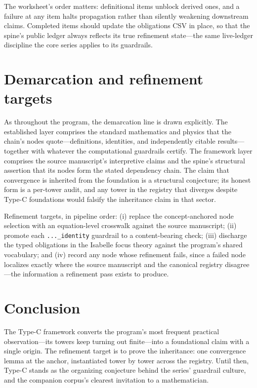 \documentclass[11pt]{article}
\theoremstyle{remark}
\begin{document}
The worksheet's order matters: definitional items unblock derived ones, and a failure at any item halts propagation rather than silently weakening downstream claims. Completed items should update the obligations CSV in place, so that the spine's public ledger always reflects its true refinement state---the same live-ledger discipline the core series applies to its guardrails.

\section{Demarcation and refinement targets}
\label{sec:demarc}

As throughout the program, the demarcation line is drawn explicitly. The established layer comprises the standard mathematics and physics that the chain's nodes quote---definitions, identities, and independently citable results---together with whatever the computational guardrails certify. The framework layer comprises the source manuscript's interpretive claims and the spine's structural assertion that its nodes form the stated dependency chain. The claim that convergence is inherited from the foundation is a structural conjecture; its honest form is a per-tower audit, and any tower in the registry that diverges despite Type-C foundations would falsify the inheritance claim in that sector.

Refinement targets, in pipeline order: (i) replace the concept-anchored node selection with an equation-level crosswalk against the source manuscript; (ii) promote each \texttt{...\_identity} guardrail to a content-bearing check; (iii) discharge the typed obligations in the Isabelle focus theory against the program's shared vocabulary; and (iv) record any node whose refinement fails, since a failed node localizes exactly where the source manuscript and the canonical registry disagree---the information a refinement pass exists to produce.

\section{Conclusion}
\label{sec:conc}

The Type-C framework converts the program's most frequent practical observation---its towers keep turning out finite---into a foundational claim with a single origin. The refinement target is to prove the inheritance: one convergence lemma at the anchor, instantiated tower by tower across the registry. Until then, Type-C stands as the organizing conjecture behind the series' guardrail culture, and the companion corpus's clearest invitation to a mathematician.
\end{document}
